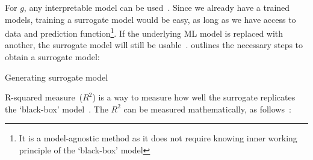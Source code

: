 \hspace*{3.5mm} For $g$, any interpretable model can be used~\cite{molnar2019interpretable}. Since we already have a trained models, training a surrogate model would be easy, as long as we have access to data and prediction function\footnote{It is a model-agnostic method as it does not require knowing inner working principle of the `black-box' model}. If the underlying ML model is replaced with another, the surrogate model will still be usable~\cite{molnar2019interpretable}.  outlines the necessary steps to obtain a surrogate model:

\begin{algorithm*}[h]
\caption{Generating surrogate model}
\small{
    \DontPrintSemicolon {}%
    \BlankLine%
    \BlankLine%
    }
     \label{algo:surrogate_model_generation}
\end{algorithm*}

\hspace*{3.5mm} R-squared measure~($R^2$) is a way to measure how well the surrogate replicates the `black-box' model~\cite{molnar2019interpretable}. The $R^2$ can be measured mathematically, as follows~\cite{molnar2019interpretable}: 

